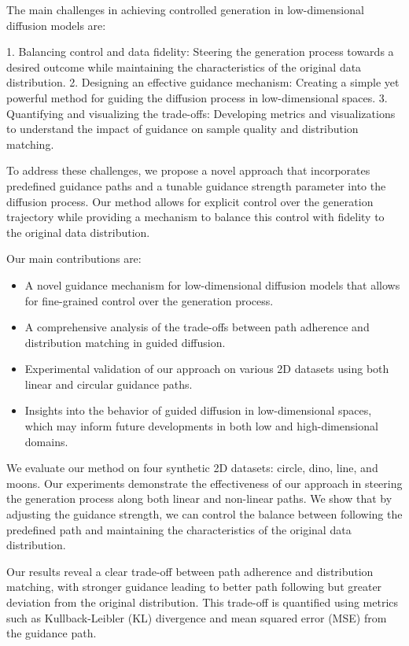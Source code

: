 \documentclass{article} %
\begin{document}
The main challenges in achieving controlled generation in low-dimensional diffusion models are:

1. Balancing control and data fidelity: Steering the generation process towards a desired outcome while maintaining the characteristics of the original data distribution.
2. Designing an effective guidance mechanism: Creating a simple yet powerful method for guiding the diffusion process in low-dimensional spaces.
3. Quantifying and visualizing the trade-offs: Developing metrics and visualizations to understand the impact of guidance on sample quality and distribution matching.

To address these challenges, we propose a novel approach that incorporates predefined guidance paths and a tunable guidance strength parameter into the diffusion process. Our method allows for explicit control over the generation trajectory while providing a mechanism to balance this control with fidelity to the original data distribution.

Our main contributions are:

\begin{itemize}
    \item A novel guidance mechanism for low-dimensional diffusion models that allows for fine-grained control over the generation process.
    \item A comprehensive analysis of the trade-offs between path adherence and distribution matching in guided diffusion.
    \item Experimental validation of our approach on various 2D datasets using both linear and circular guidance paths.
    \item Insights into the behavior of guided diffusion in low-dimensional spaces, which may inform future developments in both low and high-dimensional domains.
\end{itemize}

We evaluate our method on four synthetic 2D datasets: circle, dino, line, and moons. Our experiments demonstrate the effectiveness of our approach in steering the generation process along both linear and non-linear paths. We show that by adjusting the guidance strength, we can control the balance between following the predefined path and maintaining the characteristics of the original data distribution.

Our results reveal a clear trade-off between path adherence and distribution matching, with stronger guidance leading to better path following but greater deviation from the original distribution. This trade-off is quantified using metrics such as Kullback-Leibler (KL) divergence and mean squared error (MSE) from the guidance path.
\end{document}
